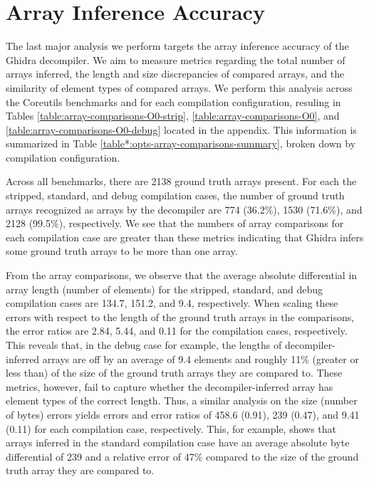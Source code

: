 \section{Array Inference Accuracy}

The last major analysis we perform targets the array inference accuracy of the Ghidra decompiler. We aim to measure metrics regarding the total number of arrays inferred, the length and size discrepancies of compared arrays, and the similarity of element types of compared arrays. We perform this analysis across the Coreutils benchmarks and for each compilation configuration, resuling in Tables \ref{table:array-comparisons-O0-strip}, \ref{table:array-comparisons-O0}, and \ref{table:array-comparisons-O0-debug} located in the appendix. This information is summarized in Table \ref{table*:opts-array-comparisons-summary}, broken down by compilation configuration.



Across all benchmarks, there are 2138 ground truth arrays present. For each the stripped, standard, and debug compilation cases, the number of ground truth arrays recognized as arrays by the decompiler are 774 (36.2\%), 1530 (71.6\%), and 2128 (99.5\%), respectively. We see that the numbers of array comparisons for each compilation case are greater than these metrics indicating that Ghidra infers some ground truth arrays to be more than one array.

From the array comparisons, we observe that the average absolute differential in array length (number of elements) for the stripped, standard, and debug compilation cases are 134.7, 151.2, and 9.4, respectively. When scaling these errors with respect to the length of the ground truth arrays in the comparisons, the error ratios are 2.84, 5.44, and 0.11 for the compilation cases, respectively. This reveals that, in the debug case for example, the lengths of decompiler-inferred arrays are off by an average of 9.4 elements and roughly 11\% (greater or less than) of the size of the ground truth arrays they are compared to. These metrics, however, fail to capture whether the decompiler-inferred array has element types of the correct length. Thus, a similar analysis on the size (number of bytes) errors yields errors and error ratios of 458.6 (0.91), 239 (0.47), and 9.41 (0.11) for each compilation case, respectively. This, for example, shows that arrays inferred in the standard compilation case have an average absolute byte differential of 239 and a relative error of 47\% compared to the size of the ground truth array they are compared to.

